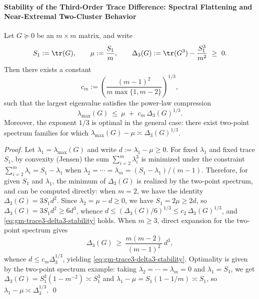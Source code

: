 \paragraph{Stability of the Third-Order Trace Difference: Spectral Flattening and Near-Extremal Two-Cluster Behavior}
\begin{proposition}\label{prop:gm-trace3-delta3-stability}
Let \(G\succeq 0\) be an \(m\times m\) matrix, and write
\[
S_1:=\tr(G),\qquad \mu:=\frac{S_1}{m},\qquad
\Delta_3(G):=\tr(G^3)-\frac{S_1^3}{m^2}\ \ge\ 0.
\]
Then there exists a constant
\[
c_m:=\left(\frac{(m-1)^2}{m\max\{1,m-2\}}\right)^{1/3},
\]
such that the largest eigenvalue satisfies the power-law compression
\begin{equation}\label{eq:gm-trace3-delta3-stability}
\boxed{\;
\lambda_{\max}(G)\ \le\ \mu\;+\;c_m\,\Delta_3(G)^{1/3}.\;}
\end{equation}
Moreover, the exponent \(1/3\) is optimal in the general case: there exist two-point spectrum families for which
\(\lambda_{\max}(G)-\mu\asymp \Delta_3(G)^{1/3}\).
\end{proposition}

\begin{proof}
Let \(\lambda_1=\lambda_{\max}(G)\) and write \(d:=\lambda_1-\mu\ge 0\).
For fixed \(\lambda_1\) and fixed trace \(S_1\), by convexity (Jensen) the sum \(\sum_{i=2}^{m}\lambda_i^3\) is minimized under the constraint \(\sum_{i=2}^{m}\lambda_i=S_1-\lambda_1\) when \(\lambda_2=\cdots=\lambda_m=(S_1-\lambda_1)/(m-1)\).
Therefore, for given \(S_1\) and \(\lambda_1\), the minimum of \(\Delta_3(G)\) is realized by the two-point spectrum, and can be computed directly:
when \(m=2\), we have the identity \(\Delta_3(G)=3S_1d^2\).
Since \(\lambda_2=\mu-d\ge 0\), we have \(S_1=2\mu\ge 2d\), so \(\Delta_3(G)=3S_1d^2\ge 6d^3\), whence \(d\le (\Delta_3(G)/6)^{1/3}\le c_2\,\Delta_3(G)^{1/3}\), and \eqref{eq:gm-trace3-delta3-stability} holds.
When \(m\ge 3\), direct expansion for the two-point spectrum gives
\[
\Delta_3(G)
\ \ge\
\frac{m(m-2)}{(m-1)^2}\,d^3,
\]
whence \(d\le c_m\Delta_3^{1/3}\), yielding \eqref{eq:gm-trace3-delta3-stability}.
Optimality is given by the two-point spectrum example: taking \(\lambda_2=\cdots=\lambda_m=0\) and \(\lambda_1=S_1\), we get \(\Delta_3(G)=S_1^3(1-m^{-2})\asymp S_1^3\) and \(\lambda_1-\mu=S_1(1-1/m)\asymp S_1\), so \(\lambda_1-\mu\asymp \Delta_3^{1/3}\). \qed
\end{proof}

